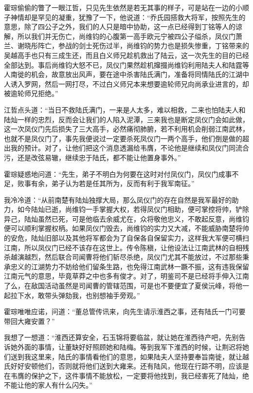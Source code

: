 霍琮偷偷的瞥了一眼江哲，只见先生依然是若无其事的样子，可是站在一边的小顺子神情却是罕见的凝重，犹豫了一下，他说道：“乔氏园搭救大将军，按照先生的意思，除了四公子之外，我们的人只是暗中协助，这一点已经得到丁铭等人的谅解，所以我们并无伤亡，尚维钧的心腹第一高手欧元宁被四公子缢杀，凤仪门萧兰、谢晓彤阵亡，参战的剑士死伤过半，尚维钧的势力也是损失惨重，丁铭带来的吴越高手也只有三成生还，而且白义师兄趁机救出了陆云，这一次先生的目的已经全部达到。事后尚维钧大怒不已，凤仪门果然趁机撺掇尚维钧利用陆夫人和陆霆等人南徙的机会，故意放出风声，要在途中杀害陆氏满门，准备将同情陆氏的江湖中人诱入罗网，然后一网打尽，不过白义师兄本来想要逾轮师兄向尚承业进言的，却被逾轮师兄拒绝。”

江哲点头道：“当日不救陆氏满门，一来是人太多，难以相救，二来也怕陆夫人和陆灿一样的忠烈，反而会让我们的人陷入泥潭，三来我也是断定凤仪门会如此做，这一次凤仪门先后损失了三大高手，必然痛彻肺腑，若不利用机会削弱江南武林，也就不是凤仪门了，事先我便说过一定要杀死凤仪门一两个高手，他们倒是做的超出我的预计。对了，让他们把这个消息透漏给韦膺，不论他是继续和凤仪门同流合污，还是改弦易辙，继续忠于陆氏，都不能让他置身事外。”

霍琮疑惑地问道：“先生，弟子不明白为何要在这时对付凤仪门，凤仪门成事不足，败事有余，弟子认为若是任其所为，反而有利于我军南征。”

我冷冷道：“从前南楚有陆灿独撑大局，那么凤仪门的存在自然是我军最好的助力，如今陆灿已逝，尚维钧一手掌握大权，若得凤仪门相助，便可掌控将帅，铲除异己，陆灿虽然已死，可是他临去余威尤在，众将敬他忠义，不敢起反意，尚维钧便可以顺利掌握权柄。如果凤仪门毁去，尚维钧的实力又大减，不能威胁南楚将帅的安危，陆灿旧部以及其他将军都会为了自保各自保留实力，这样我大军便可横扫江南，所以凤仪门已经不该存在这世上。传令陈稹，让他设法让江南武林的自相残杀越演越烈，然后联合司闻曹将他们斩尽杀绝，凤仪门尤其不能放过，不过那些秉承忠义的江湖势力不妨给他们留条生路，也免得江南武林一蹶不振，这有违我保留江南元气的意思，毕竟草莽之中也多有俊才。对了，明鉴司不是已经将手伸入江南了么，在敌国活动虽然是司闻曹的管辖范围，可是也不要便宜了夏侯沅峰，将他一起拉下水，敢带头弹劾我，也别想袖手旁观。”

霍琮唯唯应诺，问道：“董总管传讯来，向先生请示淮西之事，还有陆氏一门可要带回大雍安置？”

我想了一想道：“淮西还算安全，石玉锦将要临盆，就让她在淮西待产吧，先别告诉她外面的事情，让董缺好好照顾她和陆梅。等到我军下淮西的时候，让荆迟将她们送到我这里来，陆氏的事情看他们的意思，如果陆夫人坚持要奉旨南徙，就让越氏好好安顿他们，否则就将他们送到大雍来。还有陆风，他现在行踪不明，应该是在韦膺的保护之下，这件事情不能放松，一定要将他找到，我已经害死了陆灿，绝不能让他的家人有什么闪失。”

